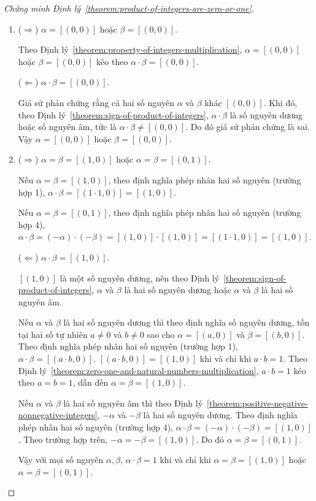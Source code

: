 \begin{proof}[Chứng minh Định lý~\ref{theorem:product-of-integers-are-zero-or-one}]
	\begin{enumerate}[label={(\roman*)}]
		\item ($\Rightarrow$) $\alpha = [(0,0)]$ hoặc $\beta = [(0,0)]$.

		      Theo Định lý~\ref{theorem:property-of-integers-multiplication}, $\alpha = [(0,0)]$ hoặc $\beta = [(0,0)]$ kéo theo $\alpha\cdot\beta = [(0,0)]$.

		      ($\Leftarrow$) $\alpha\cdot\beta = [(0,0)]$.

		      Giả sử phản chứng rằng cả hai số nguyên $\alpha$ và $\beta$ khác $[(0,0)]$. Khi đó, theo Định lý~\ref{theorem:sign-of-product-of-integers}, $\alpha\cdot\beta$ là số nguyên dương hoặc số nguyên âm, tức là $\alpha\cdot\beta \ne [(0,0)]$. Do đó giả sử phản chứng là sai. Vậy $\alpha = [(0,0)]$ hoặc $\beta = [(0,0)]$.
		\item ($\Rightarrow$) $\alpha = \beta = [(1, 0)]$ hoặc $\alpha = \beta = [(0,1)]$.

		      Nếu $\alpha = \beta = [(1, 0)]$, theo định nghĩa phép nhân hai số nguyên (trường hợp 1), $\alpha\cdot\beta = [(1\cdot 1, 0)] = [(1, 0)]$.

		      Nếu $\alpha = \beta = [(0, 1)]$, theo định nghĩa phép nhân hai số nguyên (trường hợp 4), $\alpha\cdot\beta = (-\alpha)\cdot(-\beta) = [(1,0)]\cdot [(1,0)] = [(1\cdot 1, 0)] = [(1, 0)]$.

		      ($\Leftarrow$) $\alpha\cdot\beta = [(1,0)]$.

		      $[(1,0)]$ là một số nguyên dương, nên theo Định lý~\ref{theorem:sign-of-product-of-integers}, $\alpha$ và $\beta$ là hai số nguyên dương hoặc $\alpha$ và $\beta$ là hai số nguyên âm.

		      Nếu $\alpha$ và $\beta$ là hai số nguyên dương thì theo định nghĩa số nguyên dương, tồn tại hai số tự nhiên $a\ne 0$ và $b\ne 0$ sao cho $\alpha = [(a,0)]$ và $\beta = [(b,0)]$. Theo định nghĩa phép nhân hai số nguyên (trường hợp 1), $\alpha\cdot\beta = [(a\cdot b, 0)]$. $[(a\cdot b, 0)] = [(1, 0)]$ khi và chỉ khi $a\cdot b = 1$. Theo Định lý~\ref{theorem:zero-one-and-natural-numbers-multiplication}, $a\cdot b = 1$ kéo theo $a = b = 1$, dẫn đến $\alpha = \beta = [(1,0)]$.

		      Nếu $\alpha$ và $\beta$ là hai số nguyên âm thì theo Định lý~\ref{theorem:positive-negative-nonnegative-integers}, $-\alpha$ và $-\beta$ là hai số nguyên dương. Theo định nghĩa phép nhân hai số nguyên (trường hợp 4), $\alpha\cdot\beta = (-\alpha)\cdot(-\beta) = [(1, 0)]$. Theo trường hợp trên, $-\alpha = -\beta = [(1, 0)]$. Do đó $\alpha = \beta = [(0, 1)]$.

		      Vậy với mọi số nguyên $\alpha, \beta$, $\alpha\cdot\beta = 1$ khi và chỉ khi $\alpha = \beta = [(1, 0)]$ hoặc $\alpha = \beta = [(0,1)]$.
	\end{enumerate}
\end{proof}

